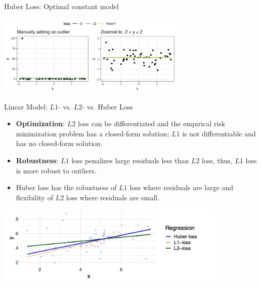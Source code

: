 \begin{vbframe}{Huber Loss: Optimal constant model}
\vspace{0.2cm}

\begin{center}
\includegraphics[width = 9cm ]{figure_man/Huber-outlier.png} \\
\end{center}


\end{vbframe}

\begin{vbframe}{Linear Model: $L1$- vs. $L2$- vs. Huber Loss}
\begin{itemize}
\item \textbf{Optimization}: $L2$ loss can be differentiated and the empirical risk minimization problem has a closed-form solution; $L1$ is not differentiable and has no closed-form solution.
\item \textbf{Robustness}: $L1$ loss penalizes large residuals less than $L2$ loss, thus, $L1$ loss is more robust to outliers.
\item Huber loss has the robustness of $L1$ loss where residuals are large and flexibility of $L2$ loss where residuals are small.
\end{itemize}

\vspace*{0.1cm}
\begin{center}
\includegraphics[width = 11cm ]{figure_man/different_losses.png}
\end{center}

\end{vbframe}




